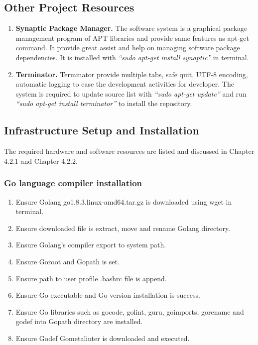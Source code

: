 \subsection{Other Project Resources}
\begin{enumerate}[topsep=0pt,itemsep=-1ex,partopsep=1ex,parsep=1.5ex]
	\item \textbf{Synaptic Package Manager. } The software system is a graphical package management program of APT libraries and provide same features as apt-get command. It provide great assist and help on managing software package dependencies. It is installed with \textit{“sudo apt-get install synaptic”} in terminal. 
	
	\item \textbf{Terminator.} Terminator provide multiple tabs, safe quit, UTF-8 encoding, automatic logging to ease the development activities for developer. The system is required to update source list with \textit{“sudo apt-get update”} and run \textit{“sudo apt-get install terminator”} to install the repository.
		
\end{enumerate}

\pagebreak

\subsection{Infrastructure Setup and Installation}

The required hardware and software resources are listed and discussed in Chapter 4.2.1 and Chapter 4.2.2. 

\subsubsection{Go language compiler installation}

\begin{enumerate}[topsep=0pt,itemsep=-1ex,partopsep=1ex,parsep=1.5ex]
	\item Ensure Golang go1.8.3.linux-amd64.tar.gz is downloaded using wget in terminal. 
	\item Ensure downloaded file is extract, move and rename Golang directory. 
	\item Ensure Golang’s compiler export to system path. 
	\item Ensure Goroot and Gopath is set. 
	\item Ensure path to user profile .bashrc file is append. 
	\item Ensure Go executable and Go version installation is success. 
	\item Ensure Go libraries such as gocode, golint, guru, goimports, gorename and godef into Gopath directory are installed. 
	\item Ensure Godef Gometalinter is downloaded and executed. 
	
\end{enumerate}

